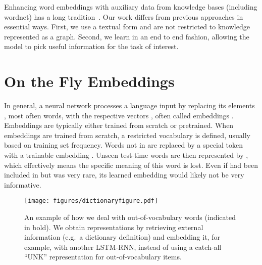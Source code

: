 Enhancing word embeddings with auxiliary data from knowledge bases (including wordnet) has a long tradition~\citep{Xu:2014:RGF:2661829.2662038, faruqui2014retrofitting}. Our work differs from previous approaches in essential ways. First, we use a textual form and are not restricted to knowledge represented as a graph. Second, we learn in an end to end fashion, allowing the model to pick useful information for the task of interest.



\section{On the Fly Embeddings}
\label{sec:methods}

In general, a neural network processes a language input by replacing its elements , most often words, with the respective vectors , often called embeddings \citep{bengio2003neural}. Embeddings are typically either trained from scratch or pretrained. When embeddings are trained from scratch, a restricted vocabulary  is defined, usually based on training set frequency.
Words not in  are replaced by a special token  with a trainable embedding . Unseen test-time words  are then represented by , which effectively means the specific meaning of this word is lost. Even if  had been included in  but was very rare, its learned embedding  would likely not be very informative.
\begin{figure}
\centering
\texttt{[image: figures/dictionaryfigure.pdf]}
\caption{\label{fig:dictionaryembed}An example of how we deal with out-of-vocabulary words (indicated in bold). We obtain representations by retrieving external information (e.g.~a dictionary definition) and embedding it, for example, with another LSTM-RNN, instead of using a catch-all ``UNK'' representation for out-of-vocabulary items.}
\end{figure}

